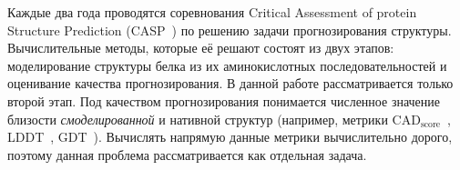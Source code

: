 \documentclass[14pt]{extarticle}
\begin{document}
Каждые два года проводятся соревнования Critical Assessment of protein Structure Prediction (CASP~\cite{CASP}) по решению задачи прогнозирования структуры. Вычислительные методы, которые её решают состоят из двух этапов: моделирование структуры белка из их аминокислотных последовательностей и оценивание качества прогнозирования. В данной работе рассматривается только второй этап. Под качеством прогнозирования понимается численное значение близости \textit{смоделированной} и нативной структур (например, метрики $\text{CAD}_\text{score}$~\cite{Olechnovic2013CADscoreAN}, LDDT~\cite{Mariani2013lDDTAL}, GDT~\cite{GDT}). Вычислять напрямую данные метрики вычислительно дорого, поэтому данная проблема рассматривается как отдельная задача.
\begin{figure}[H]
	\centering
\end{figure}
\end{document}
